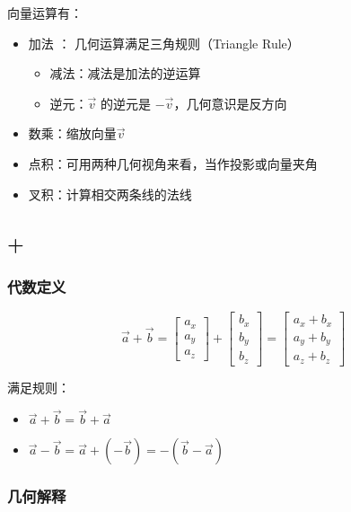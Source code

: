 \documentclass[11pt,a4paper]{report}
\begin{document}
向量运算有：
\begin{itemize}
\item 加法 ： 几何运算满足三角规则（Triangle Rule）
\begin{itemize}
\item 减法：减法是加法的逆运算
\item 逆元：$\vec{v}$ 的逆元是 $-\vec{v}$，几何意识是反方向
\end{itemize}

\item 数乘：缩放向量$\vec{v}$
\item 点积：可用两种几何视角来看，当作投影或向量夹角
\item 叉积：计算相交两条线的法线

\end{itemize}

\subsection{+}


\subsubsection{代数定义}

\[
\vec{a} + \vec{b}  = 
\begin{bmatrix}
a_x\\
a_y\\
a_z 
\end{bmatrix} + 
\begin{bmatrix}
b_x\\
b_y\\
b_z 
\end{bmatrix}
= 
\begin{bmatrix}
a_x + b_x\\
a_y + b_y\\
a_z + b_z 
\end{bmatrix}
\]

满足规则：

\begin{itemize}
\item $\vec{a} + \vec{b} = \vec{b} + \vec{a}$
\item $\vec{a} - \vec{b} = \vec{a} + (-\vec{b}) = - (\vec{b} - \vec{a})$
\end{itemize}


\subsubsection{几何解释}
\end{document}
